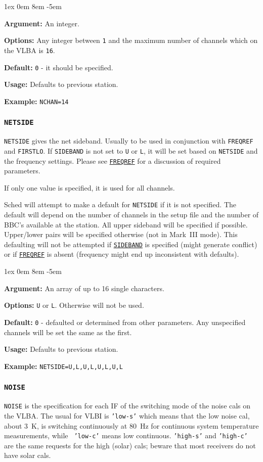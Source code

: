 \documentclass{report}
\newcommand{\rcwbox}[5]{
  \begin{list}{}{\parsep 1ex  \itemsep 0em
                 \leftmargin 8em  \itemindent -5em }
    \item {\bf Argument:} #1
    \item {\bf Options:}  #2
    \item {\bf Default:}  #3
    \item {\bf Usage:}    #4
    \item {\bf Example:}  #5
  \end{list}
}
\begin{document}
\rcwbox
{An integer.}
{Any integer between {\tt 1} and the maximum number of channels which
on the VLBA is {\tt 16}.}
{{\tt 0} - it should be specified.}
{Defaults to previous station.}
{{\tt NCHAN=14}}


\subsubsection{\label{SP:NETSIDE}{\tt NETSIDE}}

{\tt NETSIDE} gives the net sideband. Usually to be used in
conjunction with {\tt FREQREF} and {\tt FIRSTLO}. If {\tt SIDEBAND} is
not set to {\tt U} or {\tt L}, it will be set based on {\tt NETSIDE}
and the frequency settings. Please see
{\hyperref[SP:FREQREF]{{\tt FREQREF}}} for a discussion of required
parameters.

If only one value is specified, it is used for all channels.

Sched will attempt to make a default for {\tt NETSIDE} if it is
not specified.  The default will depend on the number of channels
in the setup file and the number of BBC's available at the station.
All upper sideband will be specified if possible.  Upper/lower pairs
will be specified otherwise (not in Mark~III mode).  This defaulting
will not be attempted if 
{\hyperref[SP:SIDEBAND]{{\tt SIDEBAND}}} is
specified (might generate conflict) or if 
{\hyperref[SP:FREQREF]{{\tt FREQREF}}}
is absent (frequency might end up inconsistent with
defaults).

\rcwbox
{An array of up to 16 single characters.}
{{\tt U} or {\tt L}. Otherwise will not be used.}
{{\tt 0} - defaulted or determined from other parameters.  Any
unspecified channels will be set the same as the first.}
{Defaults to previous station.}
{{\tt NETSIDE=U,L,U,L,U,L,U,L}}



\subsubsection{\label{SP:NOISE}{\tt NOISE}}

{\tt NOISE} is the specification for each IF of the switching mode of
the noise cals on the VLBA. The usual for VLBI is {\tt 'low-s'} which
means that the low noise cal, about 3~K, is switching continuously at
80~Hz for continuous system temperature measurements, while {\tt
'low-c'} means low continuous. {\tt 'high-s'} and {\tt 'high-c'} are
the same requests for the high (solar) cals; beware that most
receivers do not have solar cals.
\end{document}
